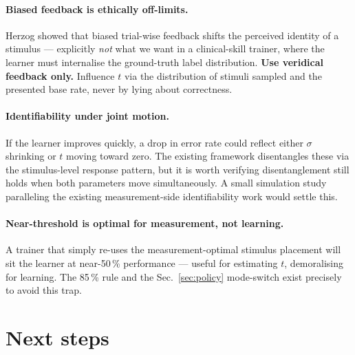 \documentclass[11pt]{article}
\begin{document}
\paragraph{Biased feedback is ethically off-limits.} Herzog showed
that biased trial-wise feedback shifts the perceived identity of a
stimulus — explicitly \emph{not} what we want in a clinical-skill
trainer, where the learner must internalise the ground-truth label
distribution. \textbf{Use veridical feedback only.} Influence $t$ via
the distribution of stimuli sampled and the presented base rate, never
by lying about correctness.

\paragraph{Identifiability under joint motion.} If the learner
improves quickly, a drop in error rate could reflect either $\sigma$
shrinking or $t$ moving toward zero. The existing framework
disentangles these via the stimulus-level response pattern, but it is
worth verifying disentanglement still holds when both parameters move
simultaneously. A small simulation study paralleling the existing
measurement-side identifiability work would settle this.

\paragraph{Near-threshold is optimal for measurement, not learning.}
A trainer that simply re-uses the measurement-optimal stimulus
placement will sit the learner at near-50\,\% performance — useful for
estimating $t$, demoralising for learning. The 85\,\% rule and the
Sec.~\ref{sec:policy} mode-switch exist precisely to avoid this trap.

\section{Next steps}
\label{sec:next}
\end{document}

